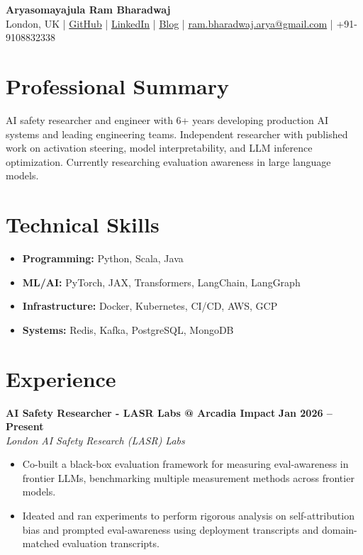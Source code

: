 \documentclass[11pt]{article}
\begin{document}
\begin{center}
\textbf{\Large Aryasomayajula Ram Bharadwaj} \\
\vspace{4pt}
London, UK | \href{https://github.com/arambharadwaj}{GitHub} | \href{https://www.linkedin.com/in/arbharadwaj97/}{LinkedIn} | \href{https://fullwrong.com}{Blog} | \href{mailto:ram.bharadwaj.arya@gmail.com}{ram.bharadwaj.arya@gmail.com} | +91-9108832338
\end{center}

\vspace{8pt}
\section{Professional Summary}
AI safety researcher and engineer with 6+ years developing production AI systems and leading engineering teams. Independent researcher with published work on activation steering, model interpretability, and LLM inference optimization. Currently researching evaluation awareness in large language models.

\section{Technical Skills}
\begin{itemize}[leftmargin=*, nosep]
\item \textbf{Programming:} Python, Scala, Java
\item \textbf{ML/AI:} PyTorch, JAX, Transformers, LangChain, LangGraph
\item \textbf{Infrastructure:} Docker, Kubernetes, CI/CD, AWS, GCP
\item \textbf{Systems:} Redis, Kafka, PostgreSQL, MongoDB
\end{itemize}

\section{Experience}

\textbf{AI Safety Researcher - LASR Labs @ Arcadia Impact} \hfill \textbf{Jan 2026 -- Present} \\
\textit{London AI Safety Research (LASR) Labs}
\begin{itemize}[leftmargin=*, nosep]
\item Co-built a black-box evaluation framework for measuring eval-awareness in frontier LLMs, benchmarking multiple measurement methods across frontier models.
\item Ideated and ran experiments to perform rigorous analysis on self-attribution bias and prompted eval-awareness using  deployment transcripts and domain-matched evaluation transcripts.
\end{itemize}
\end{document}
